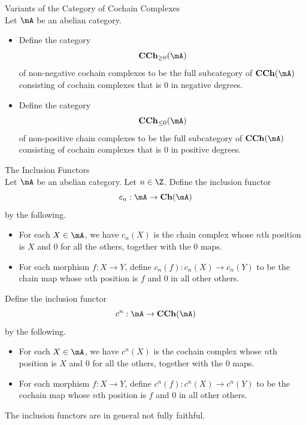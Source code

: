 \documentclass[a4paper]{article}
\begin{document}
\begin{defn}{Variants of the Category of Cochain Complexes}{}\\
Let $\mA$ be an abelian category. 
\begin{itemize}
\item Define the category $$\bold{CCh}_{\geq 0}(\mA)$$ of non-negative cochain complexes to be the full subcategory of $\bold{CCh}(\mA)$ consisting of cochain complexes that is $0$ in negative degrees. 
\item Define the category $$\bold{CCh}_{\leq 0}(\mA)$$ of non-positive chain complexes to be the full subcategory of $\bold{CCh}(\mA)$ consisting of cochain complexes that is $0$ in positive degrees. 
\end{itemize}
\end{defn}

\begin{defn}{The Inclusion Functors}{}\\
Let $\mA$ be an abelian category. Let $n\in\Z$. Define the inclusion functor $$c_n:\bold{\mA}\to\bold{Ch}(\mA)$$ by the following. 
\begin{itemize}
\item For each $X\in\mA$, we have $c_n(X)$ is the chain complex whose $n$th position is $X$ and $0$ for all the others, together with the $0$ maps. 
\item For each morphism $f:X\to Y$, define $c_n(f):c_n(X)\to c_n(Y)$ to be the chain map whose $n$th position is $f$ and $0$ in all other others. 
\end{itemize}
Define the inclusion functor $$c^n:\bold{\mA}\to\bold{CCh}(\mA)$$ by the following. 
\begin{itemize}
\item For each $X\in\mA$, we have $c^n(X)$ is the cochain complex whose $n$th position is $X$ and $0$ for all the others, together with the $0$ maps. 
\item For each morphism $f:X\to Y$, define $c^n(f):c^n(X)\to c^n(Y)$ to be the cochain map whose $n$th position is $f$ and $0$ in all other others. 
\end{itemize}
\end{defn}

The inclusion functors are in general not fully faithful. 
\end{document}
